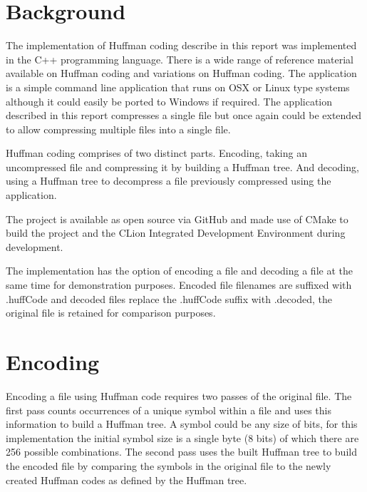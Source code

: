 

\section{Background}


\singlespacing
The implementation of Huffman coding describe in this report was implemented in the C++ programming language. There is a wide range of reference material available on Huffman coding and variations on Huffman coding. The application is a simple command line application that runs on OSX or Linux type systems although it could easily be ported to Windows if required. The application described in this report compresses a single file but once again could be extended to allow compressing multiple files into a single file.


\doublespacing
\singlespacing
Huffman coding comprises of two distinct parts. Encoding, taking an uncompressed file and compressing it by building a Huffman tree. And decoding, using a Huffman tree to decompress a file previously compressed using the application.


\doublespacing
\singlespacing
The project is available as open source via GitHub \cite{GitLink} and made use of CMake to build the project and the CLion Integrated Development Environment during development.


\doublespacing
\singlespacing
The implementation has the option of encoding a file and decoding a file at the same time for demonstration purposes. Encoded file filenames are suffixed with .huffCode and decoded files replace the .huffCode suffix with .decoded, the original file is retained for comparison purposes.


\doublespacing
\singlespacing
\section{Encoding}


\singlespacing
Encoding a file using Huffman code requires two passes of the original file. The first pass counts occurrences of a unique symbol within a file and uses this information to build a Huffman tree. A symbol could be any size of bits, for this implementation the initial symbol size is a single byte (8 bits) of which there are 256 possible combinations. The second pass uses the built Huffman tree to build the encoded file by comparing the symbols in the original file to the newly created Huffman codes as defined by the Huffman tree.



